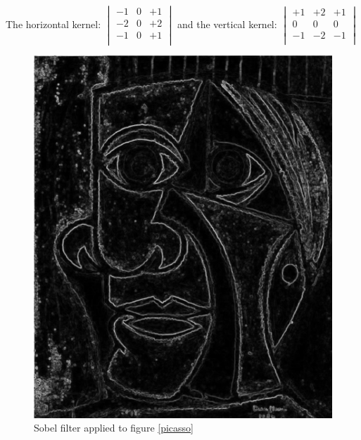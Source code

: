 \documentclass[12pt]{article}
\begin{document}
 The horizontal kernel: 
 $\begin{vmatrix}
        -1 & 0 & +1\\
        -2 & 0 & +2\\
        -1 & 0 & +1\\
\end{vmatrix}$
and the vertical kernel:
$\begin{vmatrix}
        +1 & +2 & +1\\
        0 & 0 & 0\\
        -1 & -2 & -1\\
\end{vmatrix}$

\begin{figure}[h]
\centering
\includegraphics[scale = 0.39]{img/picassoSobel}
\caption{Sobel filter applied to figure \ref{picasso}}
\label{sobel}
\end{figure}
\newpage
\end{document}
